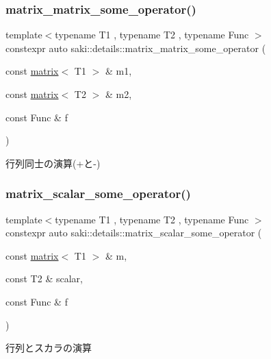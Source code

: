 \subsubsection{\texorpdfstring{matrix\+\_\+matrix\+\_\+some\+\_\+operator()}{matrix\_matrix\_some\_operator()}}
{\footnotesize\ttfamily template$<$typename T1 , typename T2 , typename Func $>$ \\
constexpr auto saki\+::details\+::matrix\+\_\+matrix\+\_\+some\+\_\+operator (\begin{DoxyParamCaption}\item[{const \mbox{\hyperlink{classsaki_1_1matrix}{matrix}}$<$ T1 $>$ \&}]{m1,  }\item[{const \mbox{\hyperlink{classsaki_1_1matrix}{matrix}}$<$ T2 $>$ \&}]{m2,  }\item[{const Func \&}]{f }\end{DoxyParamCaption})}



行列同士の演算(+と-\/) 

\mbox{\label{namespacesaki_1_1details_aa3d3214e16ce99b6f4aca7d61d41077f}} 
\subsubsection{\texorpdfstring{matrix\+\_\+scalar\+\_\+some\+\_\+operator()}{matrix\_scalar\_some\_operator()}}
{\footnotesize\ttfamily template$<$typename T1 , typename T2 , typename Func $>$ \\
constexpr auto saki\+::details\+::matrix\+\_\+scalar\+\_\+some\+\_\+operator (\begin{DoxyParamCaption}\item[{const \mbox{\hyperlink{classsaki_1_1matrix}{matrix}}$<$ T1 $>$ \&}]{m,  }\item[{const T2 \&}]{scalar,  }\item[{const Func \&}]{f }\end{DoxyParamCaption})}



行列とスカラの演算 

\mbox{\label{namespacesaki_1_1details_a67a43f1e216aa1da9934815a21bfe2ee}} 

